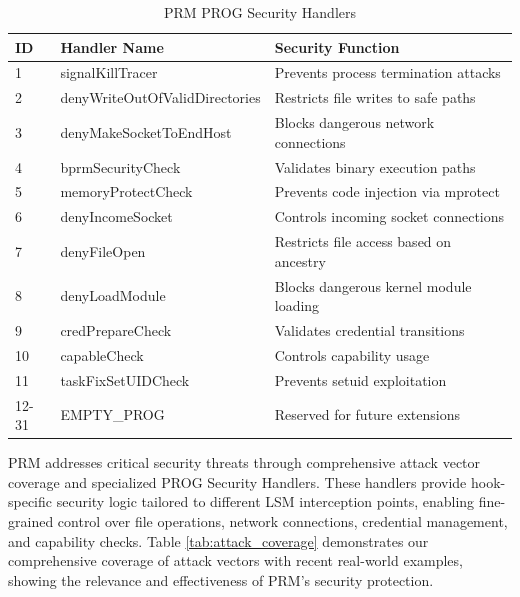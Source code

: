 \documentclass[conference]{IEEEtran}
\begin{document}
\begin{table}[htbp]
\centering
\caption{PRM PROG Security Handlers}
\label{tab:prog_handlers}
\begin{tabular}{@{}p{1cm}p{3.5cm}p{3cm}@{}}
\toprule
\textbf{ID} & \textbf{Handler Name} & \textbf{Security Function} \\
\midrule
1 & signalKillTracer & Prevents process termination attacks \\
2 & denyWriteOutOfValidDirectories & Restricts file writes to safe paths \\
3 & denyMakeSocketToEndHost & Blocks dangerous network connections \\
4 & bprmSecurityCheck & Validates binary execution paths \\
5 & memoryProtectCheck & Prevents code injection via mprotect \\
6 & denyIncomeSocket & Controls incoming socket connections \\
7 & denyFileOpen & Restricts file access based on ancestry \\
8 & denyLoadModule & Blocks dangerous kernel module loading \\
9 & credPrepareCheck & Validates credential transitions \\
10 & capableCheck & Controls capability usage \\
11 & taskFixSetUIDCheck & Prevents setuid exploitation \\
12-31 & EMPTY\_PROG & Reserved for future extensions \\
\bottomrule
\end{tabular}
\end{table}

PRM addresses critical security threats through comprehensive attack vector coverage and specialized PROG Security Handlers. These handlers provide hook-specific security logic tailored to different LSM interception points, enabling fine-grained control over file operations, network connections, credential management, and capability checks. Table \ref{tab:attack_coverage} demonstrates our comprehensive coverage of attack vectors with recent real-world examples, showing the relevance and effectiveness of PRM's security protection.
\end{document}
